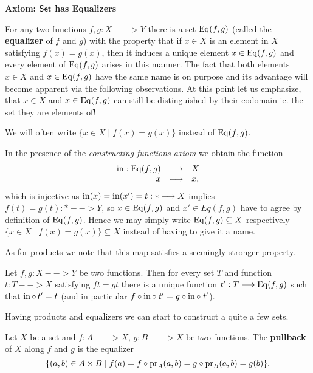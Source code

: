 	\begin{mdframed}[skipabove=1em, skipbelow=1em]
		\textbf{Axiom: $\textsf{Set}$ has Equalizers}

		For any two functions $f,g:X--> Y$ there is a set $\operatorname{Eq}(f,g)$ (called the \textbf{equalizer} of $f$ and $g$) with the property that if $x \in X$ is an element in $X$ satisfying $f(x)=g(x)$, then it induces a unique element $x \in \operatorname{Eq}(f,g)$ and every element of $\operatorname{Eq}(f,g)$ arises in this manner. The fact that both elements $x\in X$ and $x \in \operatorname{Eq}(f,g)$ have the same name is on purpose and its advantage will become apparent via the following observations. At this point let us emphasize, that $x \in X$ and $x \in \operatorname{Eq}(f,g)$ can still be distinguished by their codomain ie. the set they are elements of!

		We will often write $\{x \in X \mid f(x)=g(x)\}$ instead of $\operatorname{Eq}(f,g)$.
	\end{mdframed}

	In the presence of the \textit{constructing functions axiom} we obtain the function
	\begin{equation*}
		\begin{array}{rcl}
			\operatorname{in}:\operatorname{Eq}(f,g) & \longrightarrow & X\\
			x & \longmapsto & x,
		\end{array}
	\end{equation*}
	which is injective as $\operatorname{in}(x) = \operatorname{in}(x') = t: * --> X$ implies $f(t) = g(t): * --> Y$, so $x \in \operatorname{Eq}(f,g)$ and $x' \in Eq(f,g)$ have to agree by definition of $\operatorname{Eq}(f,g)$. Hence we may simply write $\operatorname{Eq}(f,g) \subseteq X$ respectively $\{x \in X \mid f(x) = g(x)\} \subseteq X$ instead of having to give it a name.

	As for products we note that this map satisfies a seemingly stronger property.

	\begin{lemma}
		Let $f,g:X --> Y$ be two functions. Then for every set $T$ and function $t: T --> X$ satisfying $ft = gt$ there is a unique function $t': T --> \operatorname{Eq}(f,g)$ such that $\operatorname{in} \circ \, t' = t$ (and in particular $f\circ\operatorname{in}\circ \;t' = g \circ \operatorname{in} \circ \;t'$).
	\end{lemma}

	Having products and equalizers we can start to construct a quite a few sets.

	\begin{definition}
		Let $X$ be a set and $f:A --> X$, $g:B --> X$ be two functions. The \textbf{pullback} of $X$ along $f$ and $g$ is the equalizer \begin{equation*}
			\{(a,b) \in A \times B \mid f(a) = f \circ \operatorname{pr}_A (a,b) = g \circ \operatorname{pr}_B(a,b) = g(b)\}.
		\end{equation*}
	\end{definition}

